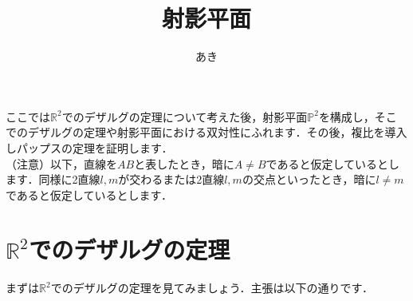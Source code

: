 \documentclass{jsarticle}
\title{射影平面}
\author{あき}
\date{}
\theoremstyle{definition}
\numberwithin{theorem}{section}
\numberwithin{equation}{section}
\begin{document}
\maketitle
ここでは$\mathbb{R}^2$でのデザルグの定理について考えた後，射影平面$\mathbb{P}^2$を構成し，そこでのデザルグの定理や射影平面における双対性にふれます．その後，複比を導入しパップスの定理を証明します．
\\（注意）以下，直線を$AB$と表したとき，暗に$A\neq B$であると仮定しているとします．同様に2直線$l,m$が交わるまたは2直線$l,m$の交点といったとき，暗に$l\neq m$であると仮定しているとします．

\section{$\mathbb{R}^2$でのデザルグの定理}
まずは$\mathbb{R}^2$でのデザルグの定理を見てみましょう．主張は以下の通りです．
\end{document}
